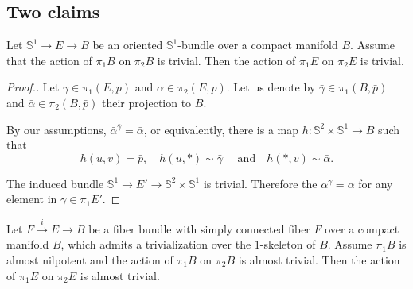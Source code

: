 \documentclass{amsart}
\begin{document}
\subsection{Two claims}

\begin{claim}
Let $\mathbb{S}^1\to E\to B$ be an oriented $\mathbb{S}^1$-bundle over a compact manifold $B$.
Assume that the action of $\pi_1B$ 
on $\pi_2B$ is trivial. 
Then  the action of $\pi_1E$ on $\pi_2E$ is trivial.
\end{claim}

\begin{proof}[Proof.] 
Let $\gamma\in \pi_1(E,p)$ and $\alpha\in \pi_2(E,p)$. 
Let us denote by $\bar\gamma\in \pi_1(B,\bar p)$ and 
$\bar\alpha\in \pi_2(B,\bar p)$ their projection to $B$.

By our assumptions, $\bar\alpha^{\bar\gamma}=\bar\alpha$, or equivalently, there is a  map
$h\colon \mathbb{S}^2\times \mathbb{S}^1\to B$ such that 
$$h(u,v)=\bar p,\quad
h(u,*)\sim\bar\gamma\quad\text{ and}\quad
h(*,v)\sim\bar\alpha.$$

The induced bundle $\mathbb{S}^1\to E'\to \mathbb{S}^2\times \mathbb{S}^1$ is trivial. 
Therefore the $\alpha^\gamma=\alpha$ 
for any element in $\gamma\in \pi_1E'$.
\end{proof}

\begin{claim}
Let $F\xrightarrow{i} E\to B$ be a fiber bundle with 
simply connected fiber $F$ over a compact manifold $B$, 
which admits a trivialization over the $1$-skeleton of $B$. 
Assume $\pi_1B$ is almost nilpotent 
and the action of $\pi_1B$ on $\pi_2B$ is almost trivial. 
Then  the action of $\pi_1E$ on $\pi_2E$ is almost trivial.
\end{claim}
\end{document}
